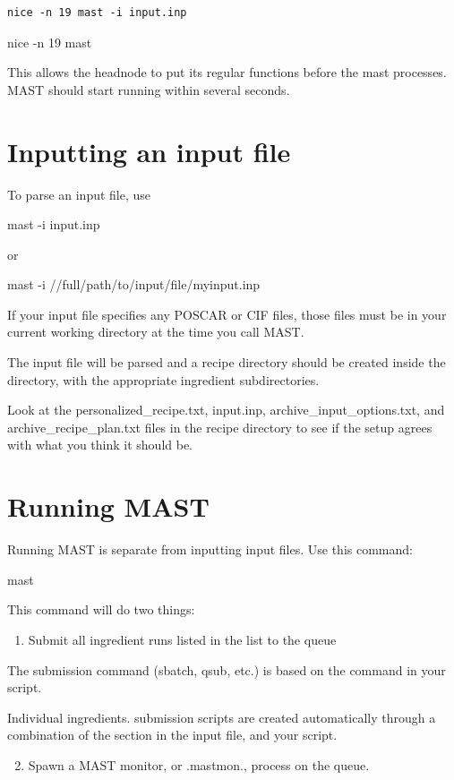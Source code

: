 \documentclass[letterpaper,10pt,english]{sphinxmanual}
\begin{document}
\begin{Verbatim}[commandchars=\\\{\}]
nice -n 19 mast -i input.inp
\end{Verbatim}

nice -n 19 mast

This allows the headnode to put its regular functions before the mast processes. MAST should start running within several seconds.


\section{Inputting an input file}
\label{5_0_runningmast:inputting-an-input-file}
To parse an input file, use

mast -i input.inp

or

mast -i //full/path/to/input/file/myinput.inp

If your input file specifies any POSCAR or CIF files, those files must be in your current working directory at the time you call MAST.

The input file will be parsed and a recipe directory should be created inside the  directory, with the appropriate ingredient subdirectories.

Look at the personalized\_recipe.txt, input.inp, archive\_input\_options.txt, and archive\_recipe\_plan.txt files in the recipe directory to see if the setup agrees with what you think it should be.


\section{Running MAST}
\label{5_0_runningmast:id1}
Running MAST is separate from inputting input files. Use this command:

mast

This command will do two things:
\begin{enumerate}
\item {} 
Submit all ingredient runs listed in the  list to the queue

\end{enumerate}

The submission command (sbatch, qsub, etc.) is based on the command in your  script.

Individual ingredients. submission scripts are created automatically through a combination of the  section in the input file, and your  script.
\begin{enumerate}
\setcounter{enumi}{1}
\item {} 
Spawn a MAST monitor, or .mastmon., process on the queue.

\end{enumerate}
\end{document}
